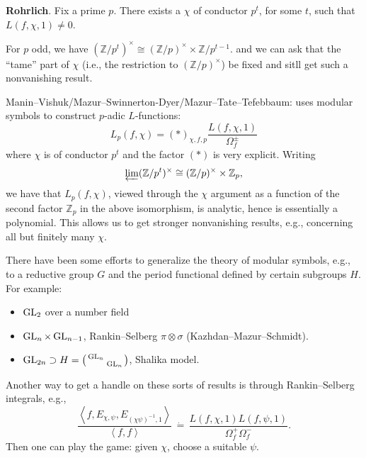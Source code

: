 \documentclass[reqno]{amsart} 
\begin{document}
\textbf{Rohrlich}.  Fix a prime $p$.  There exists a $\chi$ of conductor $p^t$, for some $t$, such that $L(f, \chi, 1) \neq 0$.

For $p$ odd, we have $(\mathbb{Z} / p^t)^\times \cong (\mathbb{Z} / p)^\times \times \mathbb{Z} / p^{t - 1}$. and we can ask that the ``tame'' part of $\chi$ (i.e., the restriction to $(\mathbb{Z} / p)^\times$) be fixed and sitll get such a nonvanishing result.

Manin--Vishuk/Mazur--Swinnerton-Dyer/Mazur--Tate--Tefebbaum: uses modular symbols to construct $p$-adic $L$-functions:
\begin{equation*}
  L_p(f, \chi) =(\ast)_{\chi, f, p} \frac{L(f, \chi, 1)}{ \Omega_f^{\pm}}
\end{equation*}
where $\chi$ is of conductor $p^t$ and the factor $(\ast)$ is very explicit.  Writing
\begin{equation*}
  \varprojlim(\mathbb{Z} / p^t )^\times \cong(\mathbb{Z} / p )^\times \times \mathbb{Z}_p,
\end{equation*}
we have that $L_p(f, \chi )$, viewed through the $\chi$ argument as a function of the second factor $\mathbb{Z}_p$ in the above isomorphism, is analytic, hence is essentially a polynomial.  This allows us to get stronger nonvanishing results, e.g., concerning all but finitely many $\chi$.

There have been some efforts to generalize the theory of modular symbols, e.g., to a reductive group $G$ and the period functional defined by certain subgroups $H$.  For example:
\begin{itemize}
\item $\operatorname{GL}_2$ over a number field
\item $\operatorname{GL}_n \times \operatorname{GL}_{n - 1}$, Rankin--Selberg $\pi \otimes \sigma$ (Kazhdan--Mazur--Schmidt).
\item $\operatorname{GL}_{2 n} \supset H = \left(
    \begin{smallmatrix}
      \operatorname{GL}_n&\\
           &\operatorname{GL}_n \\
    \end{smallmatrix}
  \right)$, Shalika model.
\end{itemize}

Another way to get a handle on these sorts of results is through Rankin--Selberg integrals, e.g.,
\begin{equation*}
  \frac{\left\langle f, E_{\chi, \psi },
      E_{(\chi \psi)^{-1}, 1}\right\rangle}{\left\langle f, f \right\rangle}
  \, \dot{=} \,
  \frac{L(f, \chi, 1)
    L(f, \psi, 1)}{\Omega_f^+ \Omega_f^- }.
\end{equation*}
Then one can play the game: given $\chi$, choose a suitable $\psi$.
\end{document}
